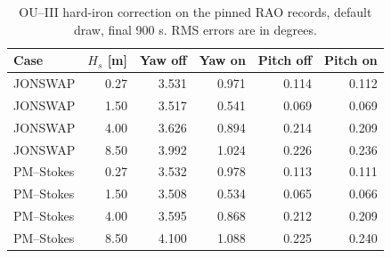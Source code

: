 \begin{table}[t]\centering
\caption{OU--III hard-iron correction on the pinned RAO records, default draw,
final 900 s. RMS errors are in degrees.}
\label{tab:mag-hi-yaw}\footnotesize
\begin{tabular}{@{}lrrrrr@{}}\toprule
Case & $H_s$ [m] & Yaw off & Yaw on & Pitch off & Pitch on \\
\midrule
JONSWAP & 0.27 & 3.531 & 0.971 & 0.114 & 0.112 \\
JONSWAP & 1.50 & 3.517 & 0.541 & 0.069 & 0.069 \\
JONSWAP & 4.00 & 3.626 & 0.894 & 0.214 & 0.209 \\
JONSWAP & 8.50 & 3.992 & 1.024 & 0.226 & 0.236 \\
PM--Stokes & 0.27 & 3.532 & 0.978 & 0.113 & 0.111 \\
PM--Stokes & 1.50 & 3.508 & 0.534 & 0.065 & 0.066 \\
PM--Stokes & 4.00 & 3.595 & 0.868 & 0.212 & 0.209 \\
PM--Stokes & 8.50 & 4.100 & 1.088 & 0.225 & 0.240 \\
\bottomrule\end{tabular}\end{table}

